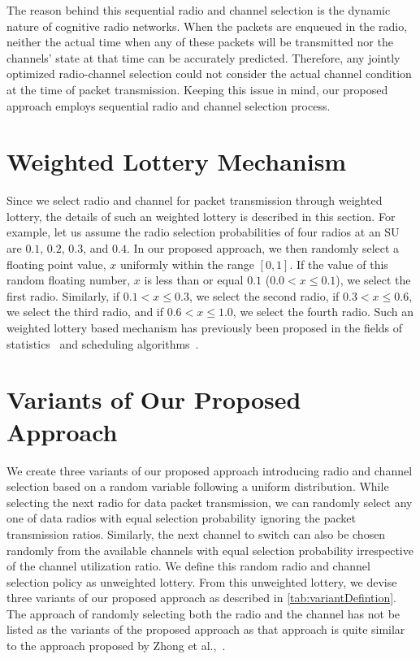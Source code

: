 The reason behind this sequential radio and channel selection is the dynamic nature of cognitive radio networks. When the packets are enqueued in the radio, neither the actual time when any of these packets will be transmitted nor the channels' state at that time can be accurately predicted. Therefore, any jointly optimized radio-channel selection could not consider the actual channel condition at the time of packet transmission. Keeping this issue in mind, our proposed approach employs sequential radio and channel selection process.

\section{Weighted Lottery Mechanism}

Since we select radio and channel for packet transmission through weighted lottery, the details of such an weighted lottery is described in this section. For example, let us assume the radio selection probabilities of four radios at an SU are $0.1$, $0.2$, $0.3$, and $0.4$. In our proposed approach, we then randomly select a floating point value, $x$  uniformly within the range $[0,1]$. If the value of this random floating number, $x$ is less than or equal $0.1$ ($0.0 < x \leq 0.1$), we select the first radio. Similarly, if $0.1 < x \leq 0.3$, we select the second radio, if $0.3 < x \leq 0.6$, we select the third radio, and if $0.6 < x \leq 1.0$, we select the fourth radio. Such an weighted lottery based mechanism has previously been proposed in the fields of statistics~\cite{tessmer2007method} and scheduling algorithms~\cite{wang2016skyline}.

\section{Variants of Our Proposed Approach}

We create three variants of our proposed approach introducing radio and channel selection based on a random variable following a uniform distribution. While selecting the next radio for data packet transmission, we can randomly select any one of data radios with equal selection probability ignoring the packet transmission ratios. Similarly, the next channel to switch can also be chosen randomly from the available channels with equal selection probability irrespective of the channel utilization ratio. We define this random radio and channel selection policy as unweighted lottery. From this unweighted lottery, we devise three variants of our proposed approach as described in \cref{tab:variantDefintion}. The approach of randomly selecting both the radio and the channel has not be listed as the variants of the proposed approach as that approach is quite similar to the approach proposed by Zhong et al.,~\cite{zhong2014capacity}.


